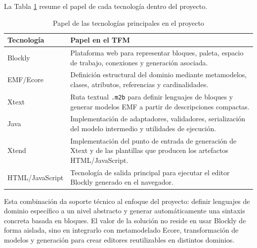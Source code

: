 La Tabla \ref{tab:tecnologias-papel} resume el papel de cada tecnología dentro
del proyecto.

\begin{table}[h]
  \centering
  \begin{tabular}{|p{}|p{}|}
    \hline
    Tecnología & Papel en el TFM \\
    \hline
    Blockly & Plataforma web para representar bloques, paleta, espacio de trabajo,
    conexiones y generación asociada. \\
    EMF/Ecore & Definición estructural del dominio mediante metamodelos,
    clases, atributos, referencias y cardinalidades. \\
    Xtext & Ruta textual \texttt{.m2b} para definir lenguajes de bloques y
    generar modelos EMF a partir de descripciones compactas. \\
    Java & Implementación de adaptadores, validadores, serialización del modelo
    intermedio y utilidades de ejecución. \\
    Xtend & Implementación del punto de entrada de generación de Xtext y de las
    plantillas que producen los artefactos HTML/JavaScript. \\
    HTML/JavaScript & Tecnología de salida principal para ejecutar el editor
    Blockly generado en el navegador. \\
    \hline
  \end{tabular}
  \caption{Papel de las tecnologías principales en el proyecto}
  \label{tab:tecnologias-papel}
\end{table}

Esta combinación da soporte técnico al enfoque del proyecto: definir lenguajes
de dominio específico a un nivel abstracto y generar automáticamente una
sintaxis concreta basada en bloques. El valor de la solución no reside en usar
Blockly de forma aislada, sino en integrarlo con metamodelado Ecore,
transformación de modelos y generación para crear editores reutilizables en
distintos dominios.
